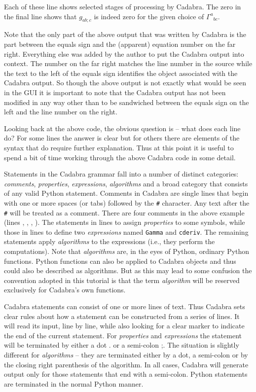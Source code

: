 \documentclass[a4paper,12pt]{article}
\numberwithin{equation}{section}%
\begin{document}
Each of these line shows selected stages of processing by Cadabra. The zero in the final
line shows that $g_{ab;c}$ is indeed zero for the given choice of $\Gamma^{a}{}_{bc}$.

Note that the only part of the above output that was written by Cadabra is the part between
the equals sign and the (apparent) equation number on the far right. Everything else was
added by the author to put the Cadabra output into context. The number on the far right
matches the line number in the source while the text to the left of the equals sign
identifies the object associated with the Cadabra output. So though the above output is not
exactly what would be seen in the GUI it is important to note that the Cadabra output has
not been modified in any way other than to be sandwiched between the equals sign on the left
and the line number on the right.

Looking back at the above code, the obvious question is -- what does each line do? For some
lines the answer is clear but for others there are elements of the syntax that do require
further explanation. Thus at this point it is useful to spend a bit of time working through
the above Cadabra code in some detail.

Statements in the Cadabra grammar fall into a number of distinct categories:
\emph{comments}, \emph{properties}, \emph{expressions}, \emph{algorithms} and a broad
category that consists of any valid Python statement. Comments in Cadabra are single lines
that begin with one or more spaces (or tabs) followed by the \verb|#| character. Any text
after the \verb|#| will be treated as a comment. There are four comments in the above
example (lines , , ,
). The statements in lines  to  assign
\emph{properties} to some symbols, while those in lines  to
 define two \emph{expressions} named \verb|Gamma| and \verb|cderiv|. The
remaining statements apply \emph{algorithms} to the expressions (i.e., they perform the
computations). Note that \emph{algorithms} are, in the eyes of Python, ordinary Python
functions. Python functions can also be applied to Cadabra objects and thus could also be
described as algorithms. But as this may lead to some confusion the convention adopted in
this tutorial is that the term \emph{algorithm} will be reserved exclusively for Cadabra's
own functions.

Cadabra statements can consist of one or more lines of text. Thus Cadabra sets clear rules
about how a statement can be constructed from a series of lines. It will read its input,
line by line, while also looking for a clear marker to indicate the end of the current
statement. For \emph{properties} and \emph{expressions} the statement will be terminated by
either a dot {\tts .} or a semi-colon {\tts ;}. The situation is slightly different for
\emph{algorithms} -- they are terminated either by a dot, a semi-colon or by the closing
right parenthesis of the algorithm. In all cases, Cadabra will generate output only for
those statements that end with a semi-colon. Python statements are terminated in the normal
Python manner.
\end{document}
